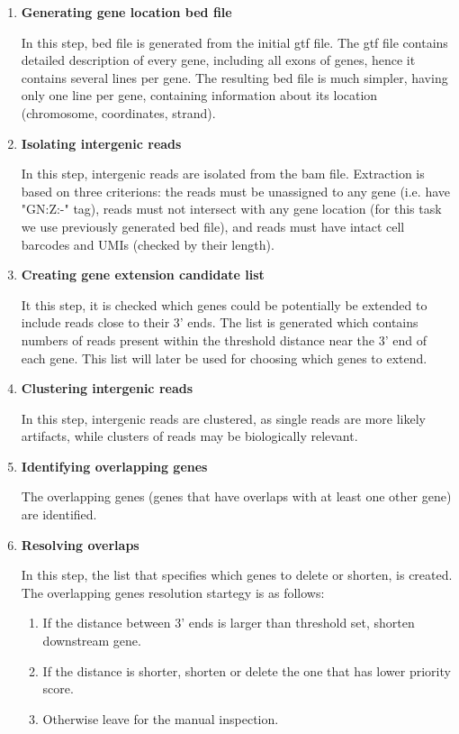 \begin{enumerate}
  \item \textbf{Generating gene location bed file}
  
  In this step, bed file is generated from the initial gtf file.
  The gtf file contains detailed description of every gene, including all exons of genes, hence it contains several lines per gene.
  The resulting bed file is much simpler, having only one line per gene, containing information about its location (chromosome, coordinates, strand).

  \item \textbf{Isolating intergenic reads}
  
  In this step, intergenic reads are isolated from the bam file.
  Extraction is based on three criterions:
  the reads must be unassigned to any gene (i.e. have "GN:Z:-" tag),
  reads must not intersect with any gene location (for this task we use previously generated bed file),
  and reads must have intact cell barcodes and UMIs (checked by their length).
  
  \item \textbf{Creating gene extension candidate list}
  
  It this step, it is checked which genes could be potentially be extended to include reads close to their 3' ends.
  The list is generated which contains numbers of reads present within the threshold distance near the 3' end of each gene.
  This list will later be used for choosing which genes to extend.
  
  \item \textbf{Clustering intergenic reads}
  
  In this step, intergenic reads are clustered, as single reads are more likely artifacts, while clusters of reads may be biologically relevant.
  
  \item \textbf{Identifying overlapping genes}
  
  The overlapping genes (genes that have overlaps with at least one other gene) are identified.
  
  \item \textbf{Resolving overlaps}
  
  In this step, the list that specifies which genes to delete or shorten, is created.
  The overlapping genes resolution startegy is as follows:
  
  \begin{enumerate}
    \item If the distance between 3' ends is larger than threshold set, shorten downstream gene.
    \item If the distance is shorter, shorten or delete the one that has lower priority score.
    \item Otherwise leave for the manual inspection.
  \end{enumerate}
  

\end{enumerate}

